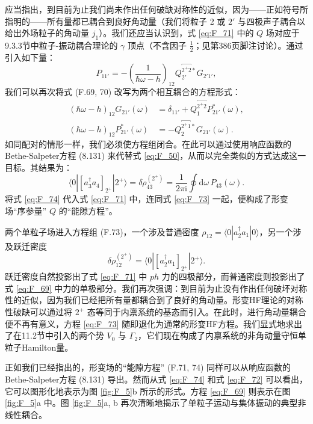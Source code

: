 应当指出，到目前为止我们尚未作出任何破缺对称性的近似，因为——正如符号所指明的——所有量都已耦合到良好角动量（我们将粒子 2 或 $2'$
与四极声子耦合以给出外场粒子的角动量 $j_{1}$）。我们还应当认识到，式 \ref{eq:F_71} 中的 $Q$ 场对应于9.3.3节中粒子-振动耦合理论的
$\gamma$ 顶点（不含因子 $\frac{1}{2}$；见第386页脚注讨论）。通过引入如下量：
\begin{equation}
P_{11'}=-\left(\frac{1}{\hbar\omega-h}\right)_{12}Q^{\overbracket{2^{+}2}*}_{2'}G_{2'1'},\label{eq:F_72}
\end{equation}
我们可以再次将式 (F.69, 70) 改写为两个相互耦合的方程形式：
\begin{align}
(\hbar\omega-h)_{12}G_{21'}(\omega) & =\delta_{11'}+Q^{\overbracket{2^{+}2}}_{1}P^{*}_{21'}(\omega),\nonumber \\
(\hbar\omega-h)_{12}P^{*}_{21'}(\omega) & =-Q^{\overbracket{2^{+}1}*}_{2}G_{21'}(\omega).\label{eq:F_73}
\end{align}
如同配对的情形一样，我们必须使方程组闭合。在此可以通过使用响应函数的Bethe-Salpeter方程 (8.131) 来代替式 \ref{eq:F_50}，从而以完全类似的方式达成这一目标。其结果为：
\begin{equation}
\langle0|[a^{\dagger}_{3}a_{4}]_{2^{+}}|2^{+}\rangle=\delta\rho^{(2^{+})}_{43}=\frac{1}{2\pi\mathrm{i}}\oint\mathrm{d}\omega\,P_{43}(\omega).\label{eq:F_74}
\end{equation}
将式 \ref{eq:F_74} 代入式 \ref{eq:F_71} 中，连同式 \ref{eq:F_73} 一起，便构成了形变场“序参量”
$Q$ 的“能隙方程”。

两个单粒子场进入方程组 (F.73)，一个涉及普通密度 $\rho_{12}=\langle0|a^{\dagger}_{2}a_{1}|0\rangle$，另一个涉及跃迁密度
\[
\delta\rho^{(2^{+})}_{12}=\langle0|[a^{\dagger}_{2}a_{1}]_{2^{+}}|2^{+}\rangle.
\]
跃迁密度自然投影出了式 \ref{eq:F_71} 中 $ph$ 力的四极部分，而普通密度则投影出了式 \ref{eq:F_69}
中力的单极部分。我们再次强调：到目前为止没有作出任何破坏对称性的近似，因为我们已经把所有量都耦合到了良好的角动量。形变HF理论的对称性破缺可以通过将
$2^{+}$ 态等同于内禀系统的基态而引入。在此时，进行角动量耦合便不再有意义，方程 \ref{eq:F_73} 随即退化为通常的形变HF方程。我们显式地求出了在11.2节中引入的两个势
$V_{0}$ 与 $\Gamma_{2}$，它们现在构成了内禀系统的非角动量守恒单粒子Hamilton量。

正如我们已经指出的，形变场的“能隙方程” (F.71, 74) 同样可以从响应函数的Bethe-Salpeter方程 (8.131)
导出。然而从式 \ref{eq:F_74} 和式 \ref{eq:F_72} 可以看出，它可以图形化地表示为图 \ref{fig:F_5}b
所示的形式。方程 \ref{eq:F_69} 则表示在图 \ref{fig:F_5}a 中。图 \ref{fig:F_5}a,
b 再次清晰地揭示了单粒子运动与集体振动的典型非线性耦合。

